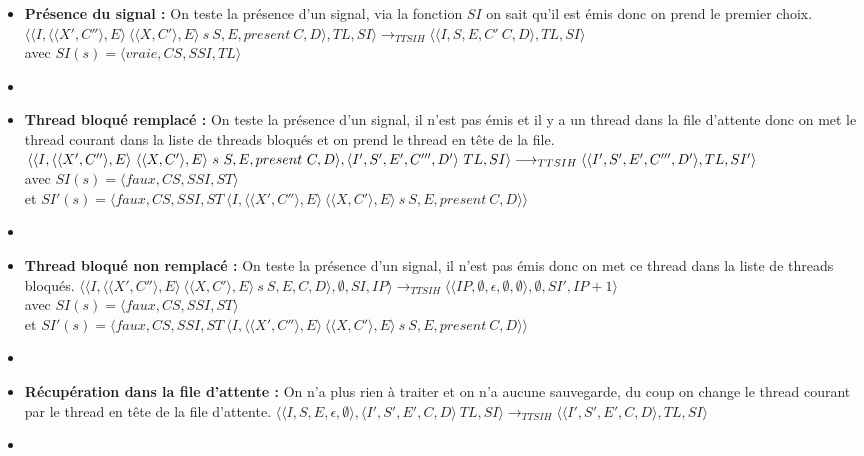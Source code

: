 \documentclass[10pt,a4paper]{report}
\begin{document}
\begin{enumerate}
\begin{itemize}
			\item[] \textbf{Présence du signal :} On teste la présence d'un signal, via la fonction $SI$ on sait qu'il est émis donc on prend le premier choix.
			\smallbreak
			$\langle\langle I,\langle\langle X',C''\rangle,E\rangle~\langle\langle X,C'\rangle,E\rangle~s~S,E,present~C,D\rangle,TL,SI\rangle 
			\longrightarrow_{TTSIH} 
			\langle\langle I,S,E,C'~C,D\rangle,TL,SI\rangle$ 
			\\avec $SI(s) = \langle vraie,CS,SSI,TL\rangle$
			\item[] \newpage
			
			
			
			
			\item[] \textbf{ Thread bloqué remplacé :} On teste la présence d'un signal, il n'est pas émis et il y a un thread dans la file d'attente donc on met le thread courant dans la liste de threads bloqués et on prend le thread en tête de la file.
			\smallbreak
			$\langle\langle I,\langle\langle X',C''\rangle,E\rangle~\langle\langle X,C'\rangle,E\rangle~s~S,E,present~C,D\rangle,\langle I',S',E',C''',D'\rangle~TL,SI\rangle 
			\\\longrightarrow_{TTSIH} 
			\langle\langle I',S',E',C''',D'\rangle,TL,SI'\rangle$ 
			\\avec $SI(s) = \langle faux,CS,SSI,ST\rangle$
			\\et $SI'(s) = \langle faux,CS,SSI,ST~\langle I,\langle\langle X',C''\rangle,E\rangle~\langle\langle X,C'\rangle,E\rangle~s~S,E,present~C,D\rangle\rangle$
			\item[]	
			
			\item[] \textbf{Thread bloqué non remplacé :} On teste la présence d'un signal, il n'est pas émis donc on met ce thread dans la liste de threads bloqués.
			\smallbreak 
			$\langle\langle I,\langle\langle X',C''\rangle,E\rangle~\langle\langle X,C'\rangle,E\rangle~s~S,E,C,D\rangle,\emptyset,SI,IP\rangle 
			\longrightarrow_{TTSIH} 
			\langle\langle IP,\emptyset,\epsilon,\emptyset,\emptyset\rangle,\emptyset,SI',IP+1\rangle$
			\\avec $SI(s) = \langle faux,CS,SSI,ST\rangle$
			\\et $SI'(s) = \langle faux,CS,SSI,ST~\langle I,\langle\langle X',C''\rangle,E\rangle~\langle\langle X,C'\rangle,E\rangle~s~S,E,present~C,D\rangle\rangle$
			\item[]
			
			\item[] \textbf{Récupération dans la file d'attente :} On n'a plus rien à traiter et on n'a aucune sauvegarde, du coup on change le thread courant par le thread en tête de la file d'attente.
			\smallbreak
			$\langle\langle I,S,E,\epsilon,\emptyset\rangle,\langle I',S',E',C,D\rangle~TL,SI\rangle 
			\longrightarrow_{TTSIH} 
			\langle\langle I',S',E',C,D\rangle,TL,SI\rangle$
			\item[]
			

\end{itemize}
\end{enumerate}
\end{document}

